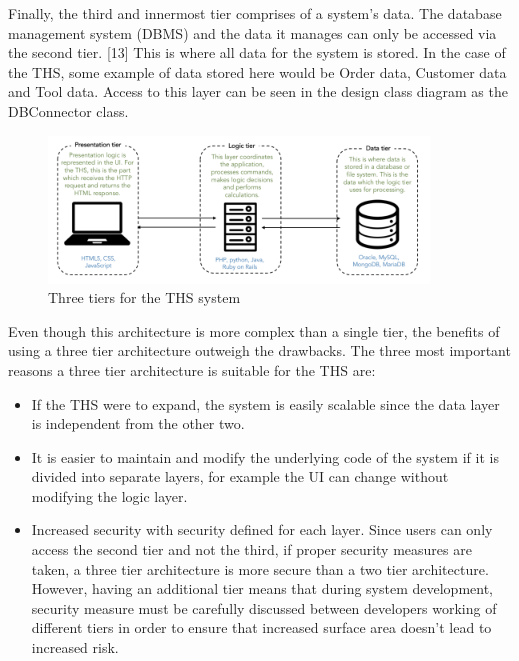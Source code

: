 Finally, the third and innermost tier comprises of a system's data. The
database management system (DBMS) and the data it manages can only be
accessed via the second tier. {[}13{]} This is where all data for the
system is stored. In the case of the THS, some example of data stored
here would be Order data, Customer data and Tool data. Access to this
layer can be seen in the design class diagram as the DBConnector class.

\begin{figure}[H]
      \centering
      \includegraphics[trim = 0 0 0 0, clip, width=0.9\textwidth]{TempImg/3TA.png}
      \caption{Three tiers for the THS system}
\end{figure}

Even though this architecture is more complex than a single tier, the
benefits of using a three tier architecture outweigh the drawbacks. The
three most important reasons a three tier architecture is suitable for
the THS are:

\begin{itemize}
  \item If the THS were to expand, the system is easily scalable since the data layer is independent from the other two.

  \item It is easier to maintain and modify the underlying code of the system if it is divided into separate layers, for example the UI can change without modifying the logic layer.

  \item Increased security with security defined for each layer. Since users can only access the second tier and not the third, if proper security measures are taken, a three tier architecture is more secure than a two tier architecture. However, having an additional tier means that during system development, security measure must be carefully discussed between developers working of different tiers in order to ensure that increased surface area doesn’t lead to increased risk. 

\end{itemize}

